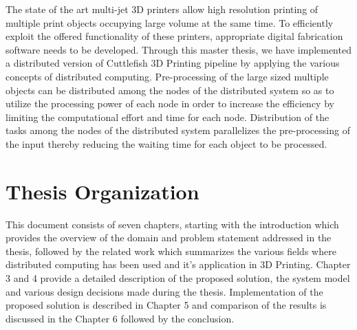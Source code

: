 The state of the art multi-jet 3D printers allow high resolution printing of multiple print objects occupying large volume at the same time. To efficiently exploit the offered functionality of these printers, appropriate digital fabrication software needs to be developed. Through this master thesis, we have implemented a distributed version of Cuttlefish 3D Printing pipeline by applying the various concepts of distributed computing. Pre-processing of the large sized multiple objects can be distributed among the nodes of the distributed system so as to utilize the processing power of each node in order to increase the efficiency by limiting the computational effort and time for each node. Distribution of the tasks among the nodes of the distributed system parallelizes the pre-processing of the input thereby reducing the waiting time for each object to be processed. 

\section{Thesis Organization}

This document consists of seven chapters, starting with the introduction which provides the overview of the domain and problem statement addressed in the thesis, followed by the related work which summarizes the various fields where distributed computing has been used and it's application in 3D Printing. Chapter 3 and 4 provide a detailed description of the proposed solution, the system model and various design decisions made during the thesis. Implementation of the proposed solution is described in Chapter 5 and comparison of the results is discussed in the Chapter 6 followed by the conclusion. 


